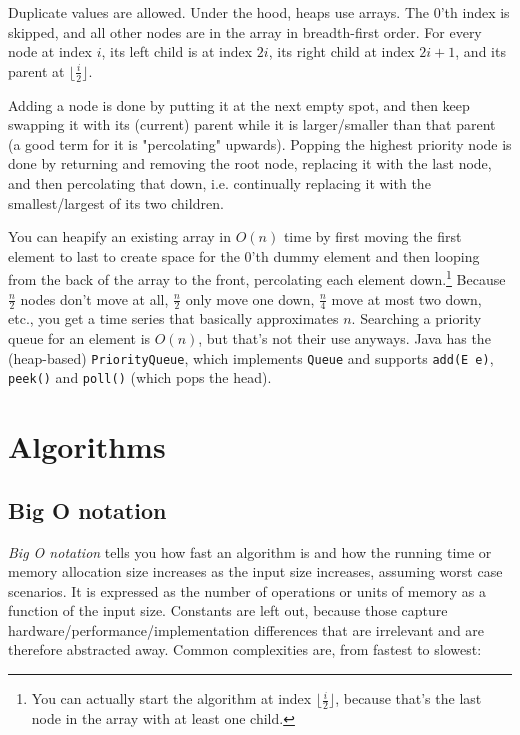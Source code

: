 \documentclass[table, xcdraw]{article}%
\begin{document}
Duplicate values are allowed. Under the hood, heaps use arrays. The $0$'th index is skipped, and all other nodes are in the array in breadth-first order. For every node at index $i$, its left child is at index $2i$, its right child at index $2i+1$, and its parent at $\lfloor \frac{i}{2}\rfloor$.

Adding a node is done by putting it at the next empty spot, and then keep swapping it with its (current) parent while it is larger/smaller than that parent (a good term for it is "percolating" upwards). Popping the highest priority node is done by returning and removing the root node, replacing it with the last node, and then percolating that down, i.e. continually replacing it with the smallest/largest of its two children.

You can heapify an existing array in $O(n)$ time by first moving the first element to last to create space for the 0'th dummy element and then looping from the back of the array to the front, percolating each element down.\footnote{You can actually start the algorithm at index $\lfloor \frac{i}{2}\rfloor$, because that's the last node in the array with at least one child.} Because $\frac{n}{2}$ nodes don't move at all, $\frac{n}{2}$ only move one down, $\frac{n}{4}$ move at most two down, etc., you get a time series that basically approximates $n$.
Searching a priority queue for an element is $O(n)$, but that's not their use anyways. Java has the (heap-based) \texttt{PriorityQueue}, which implements \texttt{Queue} and supports \texttt{add(E e)}, \texttt{peek()} and \texttt{poll()} (which pops the head).

\section{Algorithms}

\subsection{Big O notation}

\emph{Big O notation} tells you how fast an algorithm is and how the running time or memory allocation size increases as the input size increases, assuming worst case scenarios. It is expressed as the number of operations or units of memory as a function of the input size. Constants are left out, because those capture hardware/performance/implementation differences that are irrelevant and are therefore abstracted away. Common complexities are, from fastest to slowest:
\end{document}
